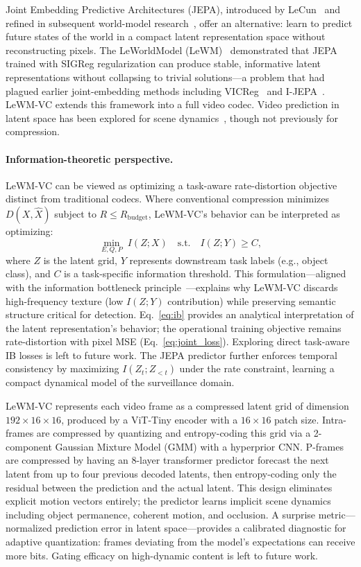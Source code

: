 \documentclass{article}
\begin{document}
Joint Embedding Predictive Architectures (JEPA), introduced by LeCun~\cite{lecun2022path} and refined in subsequent world-model research~\cite{ha2018world}, offer an alternative: learn to predict future states of the world in a compact latent representation space without reconstructing pixels. The LeWorldModel (LeWM)~\cite{maes2025leworldmodel} demonstrated that JEPA trained with SIGReg regularization can produce stable, informative latent representations without collapsing to trivial solutions---a problem that had plagued earlier joint-embedding methods including VICReg~\cite{bardes2022vicreg} and I-JEPA~\cite{assran2023ijepa}. LeWM-VC extends this framework into a full video codec. Video prediction in latent space has been explored for scene dynamics~\cite{vondrick2016genvid}, though not previously for compression.

\paragraph{Information-theoretic perspective.}
LeWM-VC can be viewed as optimizing a task-aware rate-distortion objective distinct from traditional codecs. Where conventional compression minimizes $D(X,\hat{X})$ subject to $R \leq R_{\text{budget}}$, LeWM-VC's behavior can be interpreted as optimizing:
\begin{equation}
\min_{E,Q,P} \; I(Z;X) \quad \text{s.t.} \quad I(Z;Y) \geq C,
\label{eq:ib}
\end{equation}
where $Z$ is the latent grid, $Y$ represents downstream task labels (e.g., object class), and $C$ is a task-specific information threshold. This formulation---aligned with the information bottleneck principle~\cite{tishby2000information}---explains why LeWM-VC discards high-frequency texture (low $I(Z;Y)$ contribution) while preserving semantic structure critical for detection. Eq.~\eqref{eq:ib} provides an analytical interpretation of the latent representation's behavior; the operational training objective remains rate-distortion with pixel MSE (Eq.~\ref{eq:joint_loss}). Exploring direct task-aware IB losses is left to future work. The JEPA predictor further enforces temporal consistency by maximizing $I(Z_t; Z_{<t})$ under the rate constraint, learning a compact dynamical model of the surveillance domain.

LeWM-VC represents each video frame as a compressed latent grid of dimension $192 \times 16 \times 16$, produced by a ViT-Tiny encoder with a $16 \times 16$ patch size. Intra-frames are compressed by quantizing and entropy-coding this grid via a 2-component Gaussian Mixture Model (GMM) with a hyperprior CNN. P-frames are compressed by having an 8-layer transformer predictor forecast the next latent from up to four previous decoded latents, then entropy-coding only the residual between the prediction and the actual latent. This design eliminates explicit motion vectors entirely; the predictor learns implicit scene dynamics including object permanence, coherent motion, and occlusion. A surprise metric---normalized prediction error in latent space---provides a calibrated diagnostic for adaptive quantization: frames deviating from the model's expectations can receive more bits. Gating efficacy on high-dynamic content is left to future work.
\end{document}
